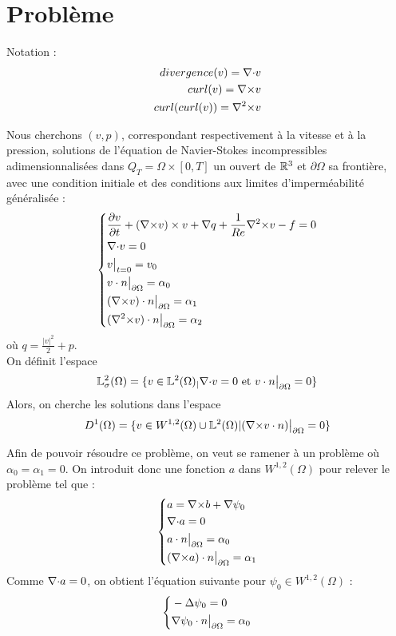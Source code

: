 \section{Problème}
Notation : 
\begin{eqnarray*}
divergence(v)={\nabla\cdot} v\\
curl(v)={\nabla\times} v\\
curl(curl(v))={\nabla^2\times} v
\end{eqnarray*}

Nous cherchons $(v,p)$, correspondant respectivement à la vitesse et à la pression, solutions de l'équation de Navier-Stokes incompressibles adimensionnalisées dans $Q_T=\Omega\times[0,T]$ un ouvert de ${\mathbb{R}}^3$ et $\partial\Omega$ sa frontière, avec une condition initiale et des conditions aux limites d'imperméabilité généralisée :
\begin{eqnarray}
\label{depart}
\left\{
\begin{aligned}
&\frac{\partial v}{\partial t} + ({\nabla\times}  v)\times v + {\nabla} q + \frac{1}{Re}{\nabla^2\times}  v-f = 0\\
&{\nabla\cdot} v = 0\\
&v\big\rvert_{t=0} = v_0\\
&v\cdot n{\big\rvert_{\partial\Omega}} = \alpha_0\\
&({\nabla\times}  v)\cdot n{\big\rvert_{\partial\Omega}} = \alpha_1\\
&({\nabla^2\times}  v)\cdot n{\big\rvert_{\partial\Omega}} = \alpha_2
\end{aligned}
\right.
\end{eqnarray}
où $q = \frac{|v|^2}{2}+p$.\\

On définit l'espace
\[
{\mathbb{L}}^2_\sigma(\Omega) = \{v \in {\mathbb{L}}^2(\Omega)_| {\nabla\cdot} v = 0\text{ et }v\cdot n{\big\rvert_{\partial\Omega}} = 0 \}
\]
Alors, on cherche les solutions dans l'espace
\[
D^1(\Omega) = \{v\in W^{1,2}(\Omega) \cup {\mathbb{L}}^2(\Omega) | ({\nabla\times} v\cdot n){\big\rvert_{\partial\Omega}} = 0  \}
\]

Afin de pouvoir résoudre ce problème, on veut se ramener à un problème où $\alpha_0=\alpha_1=0$. On introduit donc une fonction $a$ dans $W^{1,2}(\Omega)$ pour relever le problème tel que :
\begin{eqnarray}
\label{aegal}
\left\{
\begin{aligned}
&a={\nabla\times} b+{\nabla}\psi_0\\
&{\nabla\cdot} a =0\\
&a\cdot n{\big\rvert_{\partial\Omega}} = \alpha_0\\
&({\nabla\times} a)\cdot n{\big\rvert_{\partial\Omega}} = \alpha_1
\end{aligned}
\right.
\end{eqnarray}
Comme ${\nabla\cdot} a=0$, on obtient l'équation suivante pour $\psi_0\in W^{1,2}(\Omega)$ :
\begin{eqnarray}
\label{psi0}
\left\{
\begin{aligned}
&-{\Delta}\psi_0 = 0\\
&{\nabla}\psi_0\cdot n{\big\rvert_{\partial\Omega}}=\alpha_0
\end{aligned}
\right.
\end{eqnarray}

